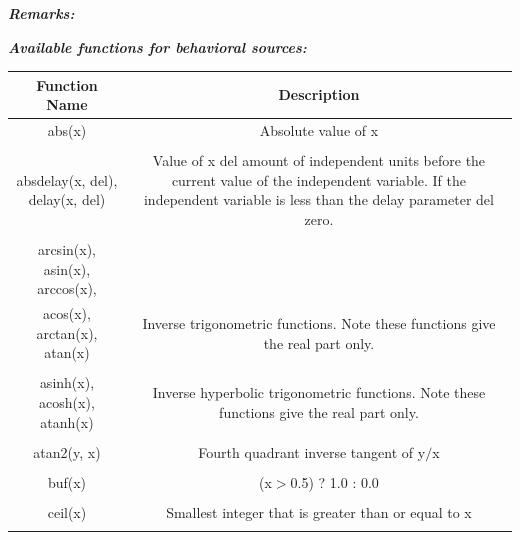 \textbf{\textit{Remarks:}}


\textbf{\textit{Available functions for behavioral sources:}}

\begin{longtable}{c c}

\hline\hline %
Function Name & Description \\ [0.5ex] %
\hline %
abs(x) & Absolute value of x \\ \\ %

absdelay(x, del), delay(x, del) & \begin{minipage}{20em}
Value of x del amount of independent units before the current value of the independent variable. If the independent variable is less than the delay parameter del zero.
\end{minipage}\\ \\

arcsin(x), asin(x), arccos(x),\\ 
acos(x), arctan(x), atan(x) & \begin{minipage}{20em}
Inverse trigonometric functions. Note these functions give the real part only.
\end{minipage}\\ \\

asinh(x), acosh(x), atanh(x) & \begin{minipage}{20em}
Inverse hyperbolic trigonometric functions. Note these functions give the real part only.
\end{minipage}\\ \\

atan2(y, x) & \begin{minipage}{20em}
Fourth quadrant inverse tangent of y$/$x
\end{minipage}\\ \\

buf(x) & \begin{minipage}{20em}
(x$>$0.5) ? 1.0 : 0.0
\end{minipage}\\ \\

ceil(x) & \begin{minipage}{20em}
Smallest integer that is greater than or equal to x
\end{minipage}\\ \\


\end{longtable}
